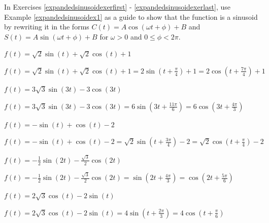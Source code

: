 \documentclass{ximera}
\begin{document}
\begin{question}
    
In Exercises \ref{expandedsinusoidexerfirst} - \ref{expandedsinusoidexerlast}, use Example \ref{expandedsinusoidex1} as a guide to show that the function is a sinusoid by rewriting it in the forms $C(t) = A \cos(\omega t + \phi) + B$ and $S(t) = A \sin(\omega t + \phi) + B$ for $\omega > 0$ and $0 \leq \phi < 2\pi$.

\begin{problem}\label{expandedsinusoidexerfirst}
$f(t) = \sqrt{2}\sin(t) + \sqrt{2}\cos(t) + 1$

\begin{solution}
$f(t) = \sqrt{2}\sin(t) + \sqrt{2}\cos(t) + 1 = 2\sin\left(t + \frac{\pi}{4}\right) + 1 = 2\cos\left(t + \frac{7\pi}{4}\right) + 1$ 
\end{solution}
\end{problem}

\begin{problem}
$f(t) = 3\sqrt{3}\sin(3t) - 3\cos(3t)$

\begin{solution}
$f(t) = 3\sqrt{3}\sin(3t) - 3\cos(3t) = 6\sin\left(3t + \frac{11\pi}{6}\right) = 6\cos\left(3t + \frac{4\pi}{3}\right)$
\end{solution}
\end{problem}

\begin{problem}
$f(t) = -\sin(t) + \cos(t) - 2$

\begin{solution}
$f(t) = -\sin(t) + \cos(t) - 2 = \sqrt{2}\sin\left(t + \frac{3\pi}{4}\right) - 2 = \sqrt{2}\cos\left(t + \frac{\pi}{4}\right) - 2$
\end{solution}
\end{problem}

\begin{problem}
$f(t) = -\frac{1}{2}\sin(2t) - \frac{\sqrt{3}}{2}\cos(2t)$

\begin{solution}
$f(t) = -\frac{1}{2}\sin(2t) - \frac{\sqrt{3}}{2}\cos(2t) = \sin\left(2t + \frac{4\pi}{3}\right) = \cos\left(2t + \frac{5\pi}{6}\right)$
\end{solution}
\end{problem}

\begin{problem}
$f(t) = 2\sqrt{3} \cos(t) - 2\sin(t)$

\begin{solution}
$f(t) = 2\sqrt{3} \cos(t) - 2\sin(t) = 4\sin\left(t+\frac{2\pi}{3}  \right)  = 4\cos\left(t + \frac{\pi}{6}\right)$
\end{solution}
\end{problem}


\end{question}
\end{document}
